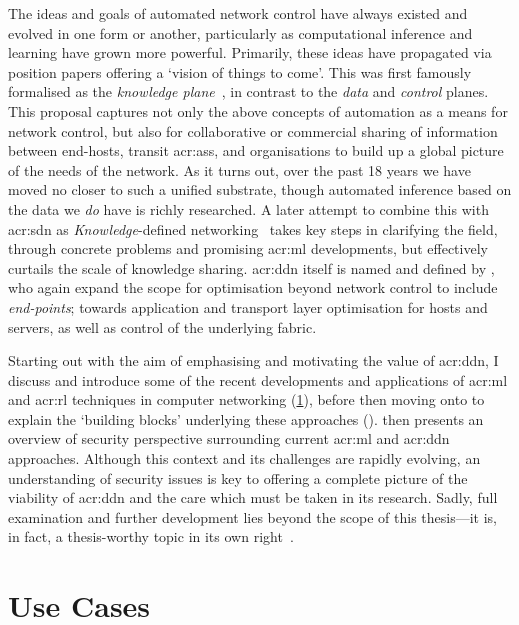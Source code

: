 The ideas and goals of automated network control have always existed and evolved in one form or another, particularly as computational inference and learning have grown more powerful.
Primarily, these ideas have propagated via position papers offering a `vision of things to come'.
This was first famously formalised as the \emph{knowledge plane}~\parencite{DBLP:conf/sigcomm/ClarkPRW03}, in contrast to the \emph{data} and \emph{control} planes.
This proposal captures not only the above concepts of automation as a means for network control, but also for collaborative or commercial sharing of information between end-hosts, transit \glspl{acr:as}, and organisations to build up a global picture of the needs of the network.
As it turns out, over the past \num{18} years we have moved no closer to such a unified substrate, though automated inference based on the data we \emph{do} have is richly researched.
A later attempt to combine this with \gls{acr:sdn} as \emph{Knowledge}-defined networking~\parencite{DBLP:journals/corr/MestresRCBASMMB16} takes key steps in clarifying the field, through concrete problems and promising \gls{acr:ml} developments, but effectively curtails the scale of knowledge sharing.
\gls{acr:ddn} itself is named and defined by \Textcite{DBLP:conf/comsnets/JiangSSZ17}, who again expand the scope for optimisation beyond network control to include \emph{end-points}; towards application and transport layer optimisation for hosts and servers, as well as control of the underlying fabric.

Starting out with the aim of emphasising and motivating the value of \gls{acr:ddn}, I discuss and introduce some of the recent developments and applications of \gls{acr:ml} and \gls{acr:rl} techniques in computer networking (\cref{sec:use-cases}), before then moving onto to explain the `building blocks' underlying these approaches ().
 then presents an overview of security perspective surrounding current \gls{acr:ml} and \gls{acr:ddn} approaches.
Although this context and its challenges are rapidly evolving, an understanding of security issues is key to offering a complete picture of the viability of \gls{acr:ddn} and the care which must be taken in its research.
Sadly, full examination and further development lies beyond the scope of this thesis---it is, in fact, a thesis-worthy topic in its own right~\parencite{papernot-thesis}.

\section{Use Cases}\label{sec:use-cases}%


